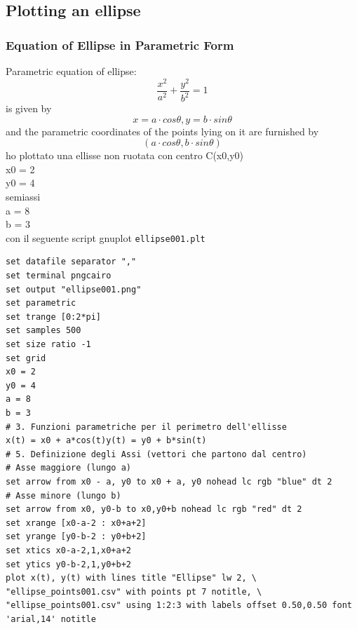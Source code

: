 \documentclass[a4paper,14pt]{article}
\begin{document}
\subsection{Plotting an ellipse}
\subsubsection{Equation of Ellipse in Parametric Form}
Parametric equation of ellipse:\\
\[ \frac{x^2}{a^2}+\frac{y^2}{b^2}=1\] is given by \[x=a \cdot cos\theta, y=b \cdot sin\theta\] and the parametric coordinates of the points lying on it are furnished by \[ (a \cdot cos\theta,b \cdot sin\theta) \]
ho plottato una ellisse non ruotata con centro C(x0,y0)\\
x0 = 2\\
y0 = 4\\
semiassi\\
a = 8\\
b = 3\\
con il seguente script gnuplot \verb|ellipse001.plt|
\begin{verbatim}
set datafile separator ","
set terminal pngcairo
set output "ellipse001.png"
set parametric
set trange [0:2*pi]
set samples 500
set size ratio -1
set grid
x0 = 2
y0 = 4
a = 8
b = 3
# 3. Funzioni parametriche per il perimetro dell'ellisse
x(t) = x0 + a*cos(t)y(t) = y0 + b*sin(t)
# 5. Definizione degli Assi (vettori che partono dal centro)
# Asse maggiore (lungo a)
set arrow from x0 - a, y0 to x0 + a, y0 nohead lc rgb "blue" dt 2
# Asse minore (lungo b)
set arrow from x0, y0-b to x0,y0+b nohead lc rgb "red" dt 2
set xrange [x0-a-2 : x0+a+2]
set yrange [y0-b-2 : y0+b+2]
set xtics x0-a-2,1,x0+a+2
set ytics y0-b-2,1,y0+b+2
plot x(t), y(t) with lines title "Ellipse" lw 2, \
"ellipse_points001.csv" with points pt 7 notitle, \
"ellipse_points001.csv" using 1:2:3 with labels offset 0.50,0.50 font 'arial,14' notitle                                                                                                                                                                                                                                                                                                                                                                                                                                                                                                                                                                                                                                                                                                                                                                                                                        \end{verbatim}
\end{document}
